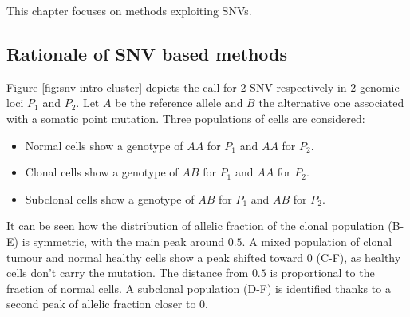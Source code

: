     This chapter focuses on methods exploiting SNVs.

    \subsection{Rationale of SNV based methods}
    Figure \ref{fig:snv-intro-cluster} depicts the call for $2$ SNV respectively in $2$ genomic loci $P_1$ and $P_2$.
    Let $A$ be the reference allele and $B$ the alternative one associated with a somatic point mutation.
    Three populations of cells are considered:

    \begin{multicols}{3}
        \begin{itemize}
            \item Normal cells show a genotype of $AA$ for $P_1$ and $AA$ for $P_2$.
            \item Clonal cells show a genotype of $AB$ for $P_1$ and $AA$ for $P_2$.
            \item Subclonal cells show a genotype of $AB$ for $P_1$ and $AB$ for $P_2$.
        \end{itemize}
    \end{multicols}

    It can be seen how the distribution of allelic fraction of the clonal population (B-E) is symmetric, with the main peak around $0.5$.
    A mixed population of clonal tumour and normal healthy cells show a peak shifted toward $0$ (C-F), as healthy cells don't carry the mutation.
    The distance from $0.5$ is proportional to the fraction of normal cells.
    A subclonal population (D-F) is identified thanks to a second peak of allelic fraction closer to $0$.

